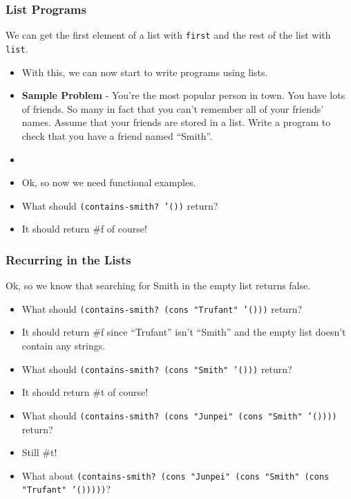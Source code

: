 \documentclass{beamer}
\begin{document}

\begin{frame}
  \frametitle{List Programs}
  We can get the first element of a list with \texttt{first} and the
  rest of the list with \texttt{list}.
  \begin{itemize}
  \item<2-> With this, we can now start to write programs using lists.
  \item<3-> \textbf{Sample Problem} - You're the most popular person in town. You have lots of friends. So many in fact that you can't remember all of your friends' names. Assume that your friends are stored in a list. Write a program to check that you have a friend named ``Smith''.
  \item<4-> \ContainsHeader
  \item<5-> Ok, so now we need functional examples.
  \item<6-> What should \texttt{(contains-smith? '())} return?
  \item<7-> It should return \#f of course!
  \end{itemize}
\end{frame}

\begin{frame}
  \frametitle{Recurring in the Lists}
  Ok, so we know that searching for Smith in the empty list returns false.
  \begin{itemize}
  \item<2-> What should \texttt{(contains-smith? (cons "Trufant" '()))} return?
  \item<3-> It should return \#f since ``Trufant'' isn't ``Smith'' and
    the empty list doesn't contain any strings.
  \item<4-> What should \texttt{(contains-smith? (cons "Smith" '()))} return?
  \item<5-> It should return \#t of course!
  \item<6-> What should \texttt{(contains-smith? (cons "Junpei" (cons "Smith" '())))} return?
  \item<7-> Still \#t!
  \item<8-> What about \texttt{(contains-smith? (cons "Junpei" (cons "Smith" (cons "Trufant" '()))))}?
  \end{itemize}
\end{frame}
\end{document}
